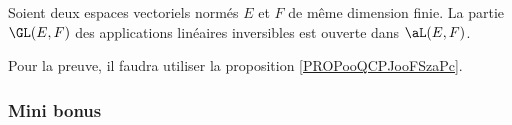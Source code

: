 \begin{proposition}	\label{PROPooPNMXooLaJDGc}
	Soient deux espaces vectoriels normés \( E\) et \( F\) de même dimension finie. La partie \( \GL(E,F)\) des applications linéaires inversibles est ouverte dans \( \aL(E,F)\).
\end{proposition}
Pour la preuve, il faudra utiliser la proposition \ref{PROPooQCPJooFSzaPc}.


\subsubsection{Mini bonus}


